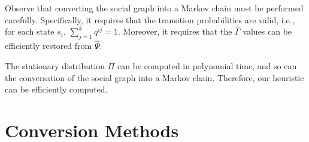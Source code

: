 \documentclass[sigconf,anonymous]{aamas}
\begin{document}
Observe that converting the social graph into a Markov chain must be performed carefully. Specifically, it
requires that the transition probabilities are valid, i.e., for each state $s_i$, $\sum_{j=1}^k q^{ij} = 1$.
Moreover, it requires that the $\hat{\Gamma}$ values can be efficiently restored from $\hat{\Psi}$.

The stationary distribution $\Pi$ can be computed in polynomial time, and so can the conversation of the social graph into a Markov chain. Therefore, our heuristic can be efficiently computed.


%

\section{Conversion Methods}  \label{sec: conversion method}


%
%
\end{document}
